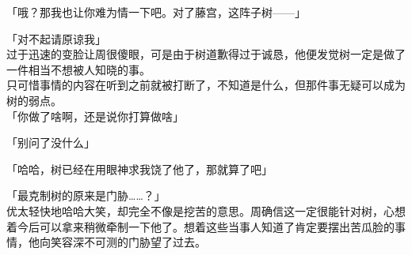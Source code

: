 「哦？那我也让你难为情一下吧。对了藤宫，这阵子树——」

「对不起请原谅我」\\

过于迅速的变脸让周很傻眼，可是由于树道歉得过于诚恳，他便发觉树一定是做了一件相当不想被人知晓的事。\\

只可惜事情的内容在听到之前就被打断了，不知道是什么，但那件事无疑可以成为树的弱点。\\

「你做了啥啊，还是说你打算做啥」

「别问了没什么」

「哈哈，树已经在用眼神求我饶了他了，那就算了吧」

「最克制树的原来是门胁……？」\\

优太轻快地哈哈大笑，却完全不像是挖苦的意思。周确信这一定很能针对树，心想着今后可以拿来稍微牵制一下他了。想着这些当事人知道了肯定要摆出苦瓜脸的事情，他向笑容深不可测的门胁望了过去。
